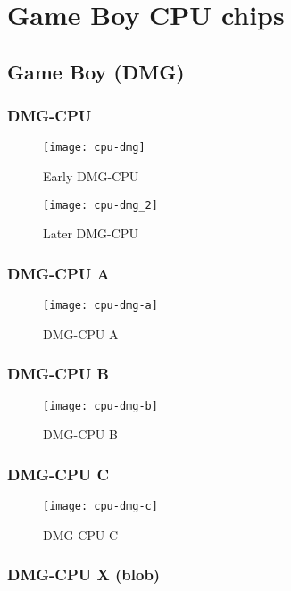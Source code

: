 \chapter{Game Boy CPU chips}

\section{Game Boy (DMG)}

\subsection{DMG-CPU}

\begin{figure}[H]
  \centering
  \texttt{[image: cpu-dmg]}
  \caption{Early DMG-CPU}
\end{figure}
\begin{figure}[H]
  \centering
  \texttt{[image: cpu-dmg\_2]}
  \caption{Later DMG-CPU}
\end{figure}

\subsection{DMG-CPU A}

\begin{figure}[H]
  \centering
  \texttt{[image: cpu-dmg-a]}
  \caption{DMG-CPU A}
\end{figure}

\subsection{DMG-CPU B}

\begin{figure}[H]
  \centering
  \texttt{[image: cpu-dmg-b]}
  \caption{DMG-CPU B}
\end{figure}

\subsection{DMG-CPU C}

\begin{figure}[H]
  \centering
  \texttt{[image: cpu-dmg-c]}
  \caption{DMG-CPU C}
\end{figure}

\subsection{DMG-CPU X (blob)}

